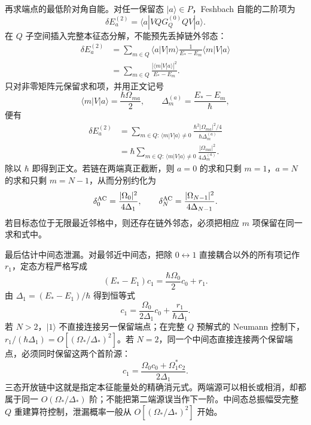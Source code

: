 \begin{derivation}[虚通道链中的有效耦合与能级移动]
再求端点的最低阶对角自能。对任一保留态 $|a\rangle\in P$，Feshbach 自能的二阶项为
\begin{equation*}
 \delta E_a^{(2)}
 =\langle a|VQG_Q^{(0)}Q V|a\rangle.
\end{equation*}
在 $Q$ 子空间插入完整本征态分解，不能预先丢掉链外邻态：
\begin{align*}
 \delta E_a^{(2)}
 &=\sum_{m\in Q}
 \langle a|V|m\rangle
 \frac1{E_*-E_m}
 \langle m|V|a\rangle\\
 &=\sum_{m\in Q}
 \frac{|\langle m|V|a\rangle|^2}{E_*-E_m}.
\end{align*}
只对非零矩阵元保留求和项，并用正文记号
\begin{equation*}
 \langle m|V|a\rangle=\frac{\hbar\Omega_{ma}}2,
 \qquad
 \Delta_m^{(a)}=\frac{E_*-E_m}{\hbar},
\end{equation*}
便有
\begin{align*}
 \delta E_a^{(2)}
 &=\sum_{m\in Q:\,\langle m|V|a\rangle\ne0}
 \frac{\hbar^2|\Omega_{ma}|^2/4}{\hbar\Delta_m^{(a)}}\\
 &=\hbar
 \sum_{m\in Q:\,\langle m|V|a\rangle\ne0}
 \frac{|\Omega_{ma}|^2}{4\Delta_m^{(a)}}.
\end{align*}
除以 $\hbar$ 即得到正文。若链在两端真正截断，则 $a=0$ 的求和只剩 $m=1$，$a=N$ 的求和只剩 $m=N-1$，从而分别约化为
\begin{equation*}
 \delta_0^{\rm AC}=\frac{|\Omega_0|^2}{4\Delta_1},
 \qquad
 \delta_N^{\rm AC}=\frac{|\Omega_{N-1}|^2}{4\Delta_{N-1}}.
\end{equation*}
若目标态位于无限最近邻格中，则还存在链外邻态，必须把相应 $m$ 项保留在同一求和式中。

最后估计中间态泄漏。对最邻近中间态，把除 $0\leftrightarrow1$ 直接耦合以外的所有项记作 $r_1$，定态方程严格写成
\begin{equation*}
 (E_*-E_1)c_1
 =\frac{\hbar\Omega_0}{2}c_0+r_1.
\end{equation*}
由 $\Delta_1=(E_*-E_1)/\hbar$ 得到恒等式
\begin{equation*}
 c_1
 =\frac{\Omega_0}{2\Delta_1}c_0
 +\frac{r_1}{\hbar\Delta_1}.
\end{equation*}
若 $N>2$，$|1\rangle$ 不直接连接另一保留端点；在完整 $Q$ 预解式的 Neumann 控制下，$r_1/(\hbar\Delta_1)=O[(\Omega_*/\Delta_*)^2]$。若 $N=2$，同一个中间态直接连接两个保留端点，必须同时保留这两个首阶源：
\[
c_1=\frac{\Omega_0c_0+\Omega_1^*c_2}{2\Delta_1}.
\]
三态开放链中这就是指定本征能量处的精确消元式。两端源可以相长或相消，却都属于同一 $O(\Omega_*/\Delta_*)$ 阶；不能把第二端源误当作下一阶。中间态总振幅受完整 $Q$ 重建算符控制，泄漏概率一般从 $O[(\Omega_*/\Delta_*)^2]$ 开始。
\end{derivation}

